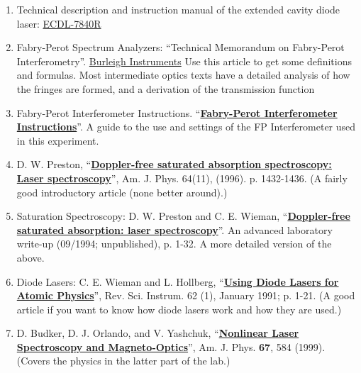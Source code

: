 \documentclass{../lab}
\begin{document}
\begin{enumerate}
    \item Technical description and instruction manual of the extended cavity diode laser: \href{http://physics111.lib.berkeley.edu/Physics111/Equipment_Manuals/manual_D1_ECDL_laser.pdf}{ECDL-7840R}

    \item Fabry-Perot Spectrum Analyzers: ``Technical Memorandum on Fabry-Perot Interferometry''. \href{http://experimentationlab.berkeley.edu/sites/default/files/tech-memo-fp-interferometry.pdf}{Burleigh Instruments} Use this article to get some definitions and formulas. Most intermediate optics texts have a detailed analysis of how the fringes are formed, and a derivation of the transmission function

    \item Fabry-Perot Interferometer Instructions. ``\href{http://physics111.lib.berkeley.edu/Physics111/Reprints/MNO/Fabry-Perot\_Instructions\_OCR.pdf}{\textbf{Fabry-Perot Interferometer Instructions}}''. A guide to the use and settings of the FP Interferometer used in this experiment.

    \item D. W. Preston, ``\href{http://physics111.lib.berkeley.edu/Physics111/Reprints/MNO/03-Doppler\_Free\_Saturated\_Absoprtion.pdf}{\textbf{Doppler-free saturated absorption spectroscopy: Laser spectroscopy}}'', Am. J. Phys. 64(11), (1996). p. 1432-1436. (A fairly good introductory article (none better around).) 
    
    \item Saturation Spectroscopy: D. W. Preston and C. E. Wieman, ``\href{http://physics111.lib.berkeley.edu/Physics111/Reprints/MNO/04-Doppler\_Free\_Saturated\_Absoprtion.pdf}{\textbf{Doppler-free saturated absorption: laser spectroscopy}}''. An advanced laboratory write-up (09/1994; unpublished), p. 1-32. A more detailed version of the above.

    \item Diode Lasers: C. E. Wieman and L. Hollberg, ``\href{http://physics111.lib.berkeley.edu/Physics111/Reprints/MNO/07-Using_Diode_Lasers.pdf}{\textbf{Using Diode Lasers for Atomic Physics}}'', Rev. Sci. Instrum. 62 (1), January 1991; p. 1-21. (A good article if you want to know how diode lasers work and how they are used.)

    \item D. Budker, D. J. Orlando, and V. Yashchuk, ``\href{http://physics111.lib.berkeley.edu/Physics111/Reprints/MNO/01-Nonlinear_Laser_Spectroscopy.pdf}{\textbf{Nonlinear Laser Spectroscopy and Magneto-Optics}}'', Am. J. Phys. \textbf{67}, 584 (1999). (Covers the physics in the latter part of the lab.)


\end{enumerate}
\end{document}
